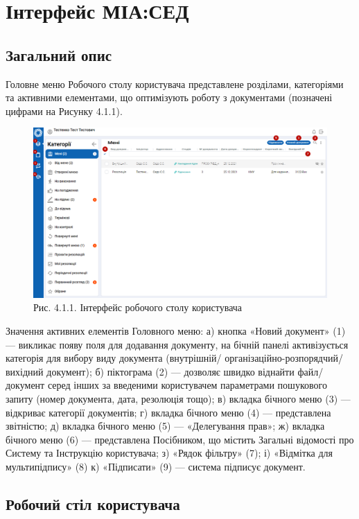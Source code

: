\chapter{Інтерфейс МІА:СЕД}

\section{Загальний опис}

Головне меню Робочого столу користувача представлене розділами, категоріями
та активними елементами, що оптимізують роботу з документами (позначені
цифрами на Рисунку 4.1.1).

\begin{figure}[!htbp]
\centerline{\includegraphics[width=\textwidth]{img/4.1.1.png}}
\caption{Рис. 4.1.1. Інтерфейс робочого столу користувача}
\end{figure}

Значення активних елементів Головного меню:
а) кнопка «Новий документ» (1) --- викликає появу поля для додавання
документу, на бічній панелі активізується категорія для вибору виду документа
(внутрішній/ організаційно-розпорядчий/ вихідний документ);
б) піктограма (2) --- дозволяє швидко віднайти файл/ документ серед інших за
введеними користувачем параметрами пошукового запиту (номер документа,
дата, резолюція тощо);
в) вкладка бічного меню (3) --- відкриває категорії документів;
г) вкладка бічного меню (4) --- представлена звітністю;
д) вкладка бічного меню (5) --- «Делегування прав»;
ж) вкладка бічного меню (6) --- представлена Посібником, що містить Загальні
відомості про Систему та Інструкцію користувача;
з) «Рядок фільтру» (7);
і) «Відмітка для мультипідпису» (8)
к) «Підписати» (9) --- система підписує документ.

\section{Робочий стіл користувача}


